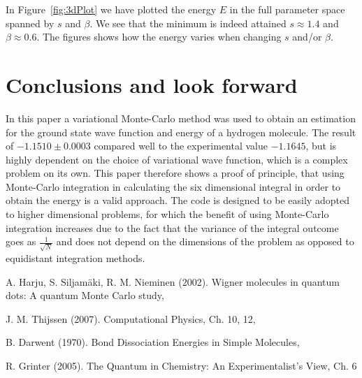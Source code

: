 \documentclass[twoside]{article}
\begin{document}
In Figure~\ref{fig:3dPlot} we have plotted the energy $E$ in the full parameter space spanned by $s$ and $\beta$. We see that the minimum is indeed attained $s \approx 1.4$ and $\beta \approx 0.6$. The figures shows how the energy varies when changing $s$ and/or $\beta$.






\section{Conclusions and look forward}\label{ch_conclusions}
In this paper a variational Monte-Carlo method was used to obtain an estimation for the ground state wave function and energy of a hydrogen molecule. The result of $-1.1510 \pm 0.0003$ compared well to the experimental value $-1.1645$, but is highly dependent on the choice of variational wave function, which is a complex problem on its own. This paper therefore shows a proof of principle, that using Monte-Carlo integration in calculating the six dimensional integral in order to obtain the energy is a valid approach. The code is designed to be easily adopted to higher dimensional problems, for which the benefit of using Monte-Carlo integration increases due to the fact that the variance of the integral outcome goes as $\frac{1}{\sqrt{N}}$ and does not depend on the dimensions of the problem as opposed to equidistant integration methods.


\begin{thebibliography}{1}
	A. Harju, S. Siljam\"aki, R. M. Nieminen (2002).
	\newblock Wigner molecules in quantum dots: A quantum Monte Carlo study,
	
	J. M. Thijssen (2007).
	\newblock Computational Physics, Ch. 10, 12,
	
	B. Darwent (1970).
	\newblock Bond Dissociation Energies in Simple Molecules,
	
	R. Grinter (2005).
	\newblock The Quantum in Chemistry: An Experimentalist's View, Ch. 6
	
\end{thebibliography}
	
\end{document}
